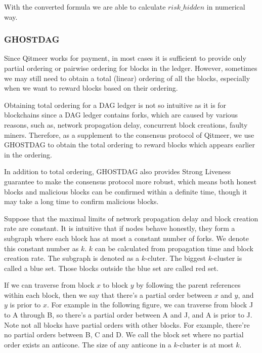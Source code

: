 \documentclass[a4paper,11pt]{article}
\begin{document}
With the converted formula we are able to calculate $risk\_hidden$ in numerical way.


\subsubsection{GHOSTDAG}


Since Qitmeer works for payment, in most cases it is
sufficient to provide only partial ordering or pairwise ordering for blocks in
the ledger. However, sometimes we may still need to obtain a total (linear)
ordering of all the blocks, especially when we want to reward blocks based on
their ordering. 

Obtaining total ordering for a DAG ledger is not so intuitive as it is for
blockchains since a DAG ledger contains forks, which are caused by various reasons, such as, network
propagation delay, concurrent block creations, faulty miners.
Therefore, as a supplement to the consensus protocol of Qitmeer, we use GHOSTDAG to
obtain the total ordering to reward blocks which appears earlier in the
ordering.

In addition to total ordering, GHOSTDAG also provides Strong Liveness guarantee
to make the consensus protocol more robust, which means both honest blocks and
malicious blocks can be confirmed within a definite time, though it may take a
long time to confirm malicious blocks.

Suppose that the maximal limits of network propagation delay and block creation
rate are constant. It is intuitive that if nodes behave honestly, they form
a subgraph where each block has at most a constant number of forks. We denote
this constant number as $k$. $k$ can be calculated from propagation time and
block creation rate. The subgraph is denoted as a $k$-cluter. The biggest
$k$-cluster is called a blue set. Those blocks outside the blue set are called
red set.

If we can traverse from block $x$ to block $y$ by following the parent
references within each block, then we say that there's a partial order between
$x$ and $y$, and $y$ is prior to $x$. For example in the following figure, we
can traverse from block J to A through B, so there's a partial order between A
and J, and A is prior to J. Note not all blocks have partial orders with other
blocks. For example, there're no partial orders between B, C and D. We call the
block set where no partial order exists an anticone. The size of any anticone in
a $k$-cluster is at most $k$.
\end{document}
